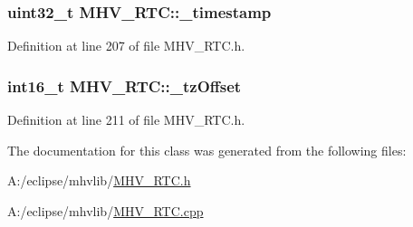 \hypertarget{class_m_h_v___r_t_c_a6ac0d6f1b8985cd6113249693da50104}{
\subsubsection[{\-\_\-timestamp}]{\setlength{\rightskip}{0pt plus 5cm}uint32\-\_\-t {\bf \-M\-H\-V\-\_\-\-R\-T\-C\-::\-\_\-timestamp}}}
\label{class_m_h_v___r_t_c_a6ac0d6f1b8985cd6113249693da50104}


\-Definition at line 207 of file \-M\-H\-V\-\_\-\-R\-T\-C.\-h.

\hypertarget{class_m_h_v___r_t_c_af9e544307713892ec196261247213490}{
\subsubsection[{\-\_\-tz\-Offset}]{\setlength{\rightskip}{0pt plus 5cm}int16\-\_\-t {\bf \-M\-H\-V\-\_\-\-R\-T\-C\-::\-\_\-tz\-Offset}}}
\label{class_m_h_v___r_t_c_af9e544307713892ec196261247213490}


\-Definition at line 211 of file \-M\-H\-V\-\_\-\-R\-T\-C.\-h.



\-The documentation for this class was generated from the following files\-:\begin{DoxyCompactItemize}
\item 
\-A\-:/eclipse/mhvlib/\hyperlink{_m_h_v___r_t_c_8h}{\-M\-H\-V\-\_\-\-R\-T\-C.\-h}\item 
\-A\-:/eclipse/mhvlib/\hyperlink{_m_h_v___r_t_c_8cpp}{\-M\-H\-V\-\_\-\-R\-T\-C.\-cpp}\end{DoxyCompactItemize}
